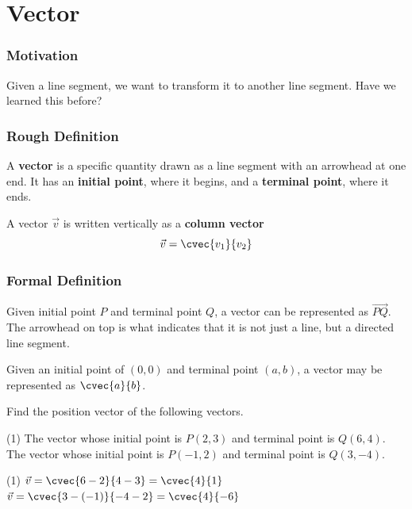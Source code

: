 \section[Vector]{Vector}
\frame{\sectionpage}

\begin{frame}
\frametitle{Motivation}
Given a line segment, we want to transform it to another line segment. Have we learned this before?
\end{frame}

\begin{frame}{}
\end{frame}

\begin{frame}
\frametitle{Rough Definition}
\begin{defn}{}{}
A \textbf{vector} is a specific quantity drawn as a line segment with an arrowhead at one end. It has an \textbf{initial point}, where it begins, and a \textbf{terminal point}, where it ends.
\end{defn}

\begin{defn}{}{}
A vector $\vec{v}$ is written vertically as a \textbf{column vector}
\begin{equation} \vec{v} = \cvec{v_1}{v_2} \end{equation}
\end{defn}
\end{frame}

\begin{frame}
\frametitle{Formal Definition}
\begin{defn}{}{}
Given initial point $P$  and terminal point $Q$,  a vector can be represented as $\overrightarrow{PQ}$.  The arrowhead on top is what indicates that it is not just a line, but a directed line segment.

\tcblower
Given an initial point of $ (0,0)$  and terminal point $ (a,b)$,  a vector may be represented as  $\cvec{a}{b}$.
\end{defn}
\end{frame}


\begin{frame}
\end{frame}


\begin{frame}[t]
\begin{ex}
Find the position vector of the following vectors.
\begin{tasks}(1)
\task The vector whose initial point is  $P(2,3)$  and terminal point is  $Q(6,4)$.  
\task The vector whose initial point is  $P(-1,2)$  and terminal point is  $Q(3,-4)$.  
\end{tasks}
\end{ex}
\begin{sol}
\begin{tasks}(1)
\task $\vec{v} = \cvec{6-2}{4-3} = \cvec{4}{1}$
\task $\vec{v} = \cvec{3-(-1)}{-4-2} = \cvec{4}{-6}$
\end{tasks}
\end{sol}
\end{frame}

